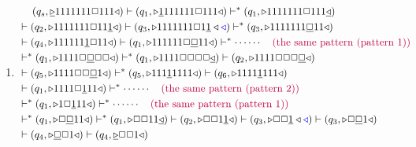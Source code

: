 \documentclass[12pt,a4paper]{article}
\makeatletter
\newtheorem*{solution}{Solution}
\theoremstyle{definition}
\renewenvironment{solution}[1][Solution] {\par\pushQED{\qed}\normalfont\topsep6\p@\@plus6\p@\relax\trivlist\item[\hskip\labelsep\bfseries#1\@addpunct{.}]\ignorespaces}{\popQED\endtrivlist\@endpefalse} \makeatother
\makeatother
\begin{document}
\begin{enumerate}
\begin{solution}
\begin{enumerate}
\begin{displaymath}
\begin{aligned}
 & \quad\ (q_s,\underline{\triangleright}  1  1  1  1  1  1  1  \Box 1  1  1   \triangleleft)
 \vdash (q_1,\triangleright  \underline{1}  1  1  1  1  1  1  \Box 1  1  1   \triangleleft)
 \vdash^* (q_1,\triangleright  1  1  1  1  1  1  1  \Box 1  1  1   \underline{\triangleleft}) \\
 & \vdash (q_2,\triangleright  1  1  1  1  1  1  1  \Box 1  1 \underline{1} \triangleleft)
 \vdash (q_3,\triangleright  1  1  1  1  1  1  1  \Box 1  \underline{1} \triangleleft {\color{blue}\triangleleft})
 \vdash^* (q_3,\triangleright  1  1  1  1  1  1  1  \underline{\Box} 1  1 \triangleleft) \\
 & \vdash (q_4,\triangleright  1  1  1  1  1  1  \underline{1} \Box 1  1 \triangleleft)
 \vdash (q_1, \triangleright  1  1  1  1  1  1  \Box \underline{\Box} 1  1 \triangleleft)
 \vdash^* \cdots \cdots \quad \textrm{\color{purple} (the same pattern (pattern 1)) } \\
 & \vdash^* (q_1,\triangleright  1  1  1  1  \Box  \underline{\Box} \Box \Box \triangleleft)
 \vdash^* (q_1,\triangleright  1  1  1  1  \Box  \Box \Box \Box \underline{\triangleleft})
 \vdash (q_2,\triangleright  1  1  1  1  \Box \Box \Box \underline{\Box} \triangleleft) \\
 & \vdash (q_5,\triangleright  1  1  1  1  \Box \Box \underline{\Box} 1 \triangleleft)
 \vdash^* (q_5,\triangleright  1  1  1  \underline{1} 1 1 1 1 \triangleleft)
 \vdash (q_6,\triangleright  1  1  1  1 \underline{1} 1 1 1 \triangleleft) \\
 & \vdash (q_1,\triangleright  1  1  1  1 \Box \underline{1} 1 1 \triangleleft)
 \vdash^* \cdots \cdots \quad \textrm{\color{purple} (the same pattern (pattern 2)) } \\
 & \vdash^* (q_1,\triangleright  1 \Box \underline{1} 1 1 \triangleleft)
 \vdash^* \cdots \cdots \quad \textrm{\color{purple} (the same pattern (pattern 1)) } \\
 & \vdash^* (q_1,\triangleright \Box  \underline{\Box} 1 1 \triangleleft)
 \vdash^* (q_1,\triangleright \Box  \Box 1 1 \underline{\triangleleft})
 \vdash (q_2,\triangleright \Box  \Box 1 \underline{1} \triangleleft)
 \vdash (q_3, \triangleright \Box \Box \underline{1} \triangleleft {\color{blue}\triangleleft})
 \vdash (q_3, \triangleright \Box \underline{\Box} 1 \triangleleft) \\
 & \vdash (q_4, \triangleright \underline{\Box} \Box 1 \triangleleft)
 \vdash (q_4, \underline{\triangleright} \Box \Box 1 \triangleleft)

\end{aligned}
\end{displaymath}
\end{enumerate}
\end{solution}
\end{enumerate}
\end{document}
